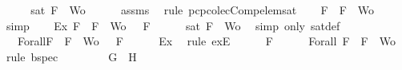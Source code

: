 \begin{isabellebody}
\ {\isacharminus}\isanewline
\ \ \isamarkupfalse%
\ {\isachardoublequoteopen}sat\ {\isacharparenleft}{\isacharbraceleft}F{\isacharbraceright}\ {\isasymunion}\ Wo{\isacharparenright}{\isachardoublequoteclose}\isanewline
\ \ \ \ \isamarkupfalse%
\ assms{\isacharparenleft}{}{\isacharcomma}{}{\isacharcomma}{}{\isacharcomma}{}{\isacharparenright}\ \isamarkupfalse%
\ {\isacharparenleft}rule\ pcp{\isacharunderscore}colecComp{\isacharunderscore}elem{\isacharunderscore}sat{\isacharparenright}\isanewline
\ \ \isamarkupfalse%
\ {\isachardoublequoteopen}F\ {\isasymin}\ {\isacharbraceleft}F{\isacharbraceright}\ {\isasymunion}\ Wo{\isachardoublequoteclose}\isanewline
\ \ \ \ \isamarkupfalse%
\ simp\isanewline
\ \ \isamarkupfalse%
\ Ex{}{\isacharcolon}{\isachardoublequoteopen}{\isasymexists}{\isasymA}{\isachardot}\ {\isasymforall}F\ {\isasymin}\ {\isacharparenleft}{\isacharbraceleft}F{\isacharbraceright}\ {\isasymunion}\ Wo{\isacharparenright}{\isachardot}\ {\isasymA}\ {\isasymTurnstile}\ F{\isachardoublequoteclose}\isanewline
\ \ \ \ \isamarkupfalse%
\ {\isacartoucheopen}sat\ {\isacharparenleft}{\isacharbraceleft}F{\isacharbraceright}\ {\isasymunion}\ Wo{\isacharparenright}{\isacartoucheclose}\ \isamarkupfalse%
\ {\isacharparenleft}simp\ only{\isacharcolon}\ sat{\isacharunderscore}def{\isacharparenright}\isanewline
\ \ \isamarkupfalse%
\ {\isasymA}\ \ Forall{}{\isacharcolon}{\isachardoublequoteopen}{\isasymforall}F\ {\isasymin}\ {\isacharparenleft}{\isacharbraceleft}F{\isacharbraceright}\ {\isasymunion}\ Wo{\isacharparenright}{\isachardot}\ {\isasymA}\ {\isasymTurnstile}\ F{\isachardoublequoteclose}\isanewline
\ \ \ \ \isamarkupfalse%
\ Ex{}\ \isamarkupfalse%
\ {\isacharparenleft}rule\ exE{\isacharparenright}\isanewline
\ \ \isamarkupfalse%
\ {\isachardoublequoteopen}{\isasymA}\ {\isasymTurnstile}\ F{\isachardoublequoteclose}\isanewline
\ \ \ \ \isamarkupfalse%
\ Forall{}\ {\isacartoucheopen}F\ {\isasymin}\ {\isacharbraceleft}F{\isacharbraceright}\ {\isasymunion}\ Wo{\isacartoucheclose}\ \isamarkupfalse%
\ {\isacharparenleft}rule\ bspec{\isacharparenright}\isanewline
\ \ \isamarkupfalse%
\ \isamarkupfalse%
\ {\isachardoublequoteopen}{\isasymA}\ {\isasymTurnstile}\ \isactrlbold {\isasymnot}\ {\isacharparenleft}G\ \isactrlbold {\isasymand}\ H{\isacharparenright}{\isachardoublequoteclose}\isanewline

\end{isabellebody}
